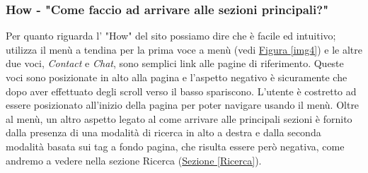 \subsubsection{How - "Come faccio ad arrivare alle sezioni principali?"} \label{HHow}
Per quanto riguarda l' "How" del sito possiamo dire che è facile ed intuitivo; utilizza il menù a tendina per la prima voce a menù (vedi \hyperref[img4]{Figura \ref{img4}}) e le altre due voci, \textit{Contact} e \textit{Chat}, sono semplici link alle pagine di riferimento.
Queste voci sono posizionate in alto alla pagina e l'aspetto negativo è sicuramente che dopo aver effettuato degli scroll verso il basso spariscono. L'utente è costretto ad essere posizionato all'inizio della pagina per poter navigare usando il menù.
Oltre al menù, un altro aspetto legato al come arrivare alle principali sezioni è fornito dalla presenza di una modalità di ricerca in alto a destra e dalla seconda modalità basata sui tag a fondo pagina, che risulta essere però negativa, come andremo a vedere nella sezione Ricerca (\hyperref[Ricerca]{Sezione \ref{Ricerca}}).






